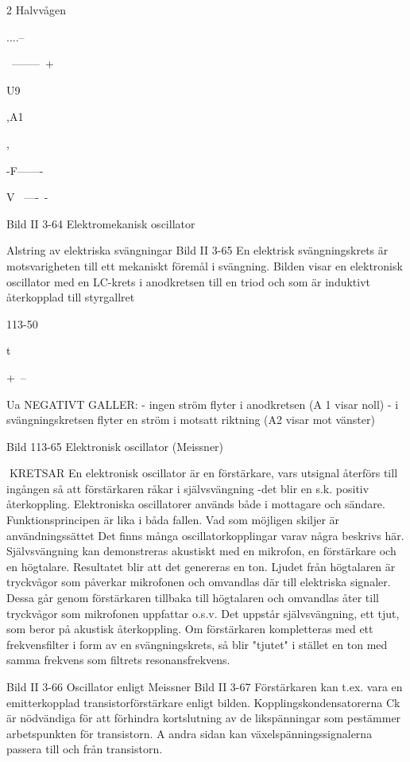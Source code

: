 \documentclass[a4paper,twoside,twocolumn,openright]{book}
\begin{document}
{{{{{{{{2 Halvvågen

....--~

~--------~+

U9

,A1

,

-F-------~

V
~----~-

Bild II 3-64 Elektromekanisk oscillator

Alstring av elektriska svängningar
Bild II 3-65
En elektrisk svängningskrets är motsvarigheten till ett mekaniskt föremål i svängning.
Bilden visar en elektronisk oscillator med en
LC-krets i anodkretsen till en triod och som
är induktivt återkopplad till styrgallret

113-50

t

+~--~

Ua
NEGATIVT GALLER:
- ingen ström flyter i anodkretsen
(A 1 visar noll)
- i svängningskretsen flyter en ström
i motsatt riktning
(A2 visar mot vänster)

Bild 113-65 Elektronisk oscillator (Meissner)

KRETSAR
En elektronisk oscillator är en förstärkare, vars utsignal återförs till ingången så
att förstärkaren råkar i självsvängning -det
blir en s.k. positiv återkoppling.
Elektroniska oscillatorer används både i
mottagare och sändare. Funktionsprincipen
är lika i båda fallen. Vad som möjligen skiljer
är användningssättet Det finns många oscillatorkopplingar varav några beskrivs här.
Självsvängning kan demonstreras akustiskt med en mikrofon, en förstärkare och en
högtalare. Resultatet blir att det genereras
en ton. Ljudet från högtalaren är tryckvågor
som påverkar mikrofonen och omvandlas
där till elektriska signaler. Dessa går genom
förstärkaren tillbaka till högtalaren och omvandlas åter till tryckvågor som mikrofonen
uppfattar o.s.v. Det uppstår självsvängning,
ett tjut, som beror på akustisk återkoppling.
Om förstärkaren kompletteras med ett frekvensfilter i form av en svängningskrets, så
blir "tjutet" i stället en ton med samma frekvens som filtrets resonansfrekvens.

Bild II 3-66 Oscillator enligt Meissner
Bild II 3-67
Förstärkaren kan t.ex. vara en emitterkopplad transistorförstärkare enligt bilden.
Kopplingskondensatorerna Ck är nödvändiga för att förhindra kortslutning av de likspänningar som pestämmer arbetspunkten
för transistorn. A andra sidan kan växelspänningssignalerna passera till och från
transistorn.

}}}}}}}}
\end{document}
